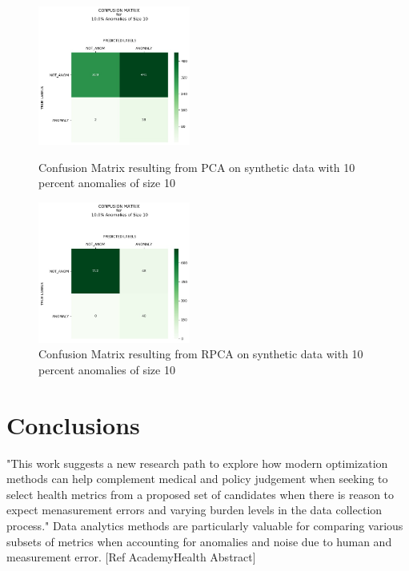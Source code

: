 \documentclass[conference]{IEEEtran}
\begin{document}
\begin{figure}[H]
\begin{minipage}[b]{0.45\linewidth}
    \centering

    \includegraphics[width=50mm, scale=0.5]{cmPCATest_400AnomSize10.jpg}
    \caption{Confusion Matrix resulting from PCA on synthetic data with 10 percent anomalies of size 10}
    \label{fig::CMtrainPCA40010}
\end{minipage}
\quad
\begin{minipage}[b]{0.45\linewidth}
    \centering
    \includegraphics[width=50mm, scale=0.5]{cmRPCATest_400AnomSize10.jpg}
    \caption{Confusion Matrix resulting from RPCA on synthetic data with 10 percent anomalies of size 10}
    \label{fig::CMtrainRPCA40010}
\end{minipage}
\end{figure}


\section{Conclusions}

"This work suggests a new research path to explore how modern optimization methods can help complement medical and policy judgement when seeking to select health metrics from a proposed set of candidates when there is reason to expect menasurement errors and varying burden levels in the data collection process." Data analytics methods are particularly valuable for comparing various subsets of metrics when accounting for anomalies and noise due to human and measurement error. [Ref AcademyHealth Abstract]




\newpage
\listoftodos[Notes]
\end{document}
